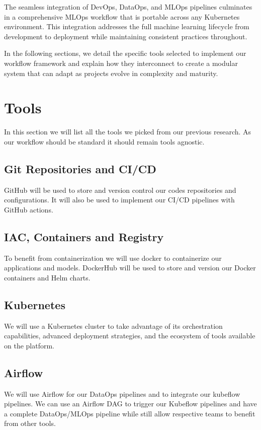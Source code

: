 The seamless integration of DevOps, DataOps, and MLOps pipelines culminates in a comprehensive MLOps workflow that is portable across any Kubernetes environment. This integration addresses the full machine learning lifecycle from development to deployment while maintaining consistent practices throughout.


In the following sections, we detail the specific tools selected to implement our workflow framework and explain how they interconnect to create a modular system that can adapt as projects evolve in complexity and maturity.



\section{Tools}\label{sec:tools2}
In this section we will list all the tools we picked from our previous research.
As our workflow should be standard it should remain tools agnostic.

\subsection{Git Repositories and CI/CD}\label{subsec:github}
GitHub will be used to store and version control our codes repositories and configurations.
It will also be used to implement our CI/CD pipelines with GitHub actions.

\subsection{IAC, Containers and Registry}\label{subsec:dockerhub}
To benefit from containerization we will use docker to containerize our applications and models.
DockerHub will be used to store and version our Docker containers and Helm charts.

\subsection{Kubernetes}\label{subsec:kubernetes}
We will use a Kubernetes cluster to take advantage of its orchestration capabilities, advanced deployment strategies,
and the ecosystem of tools available on the platform.

\subsection{Airflow}\label{subsec:airflow}
We will use Airflow for our DataOps pipelines and to integrate our kubeflow pipelines.
We can use an Airflow DAG to trigger our Kubeflow pipelines and have a complete DataOps/MLOps pipeline while still allow respective teams
to benefit from other tools.

